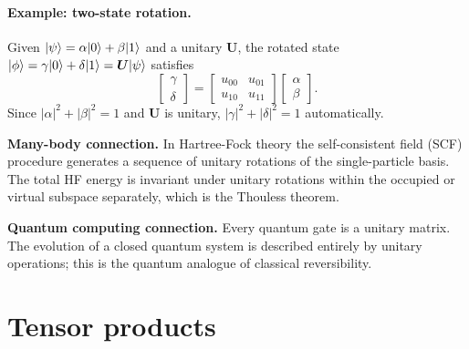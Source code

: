 \paragraph{Example: two-state rotation.}
Given $\vert \psi \rangle=\alpha\vert 0 \rangle+\beta\vert 1 \rangle$ and a unitary $\bm{U}$,
the rotated state
$\vert \phi \rangle=\gamma\vert 0 \rangle+\delta\vert 1 \rangle=\bm{U}\vert \psi \rangle$ satisfies
\[
  \begin{bmatrix}\gamma\\\delta\end{bmatrix}
  =\begin{bmatrix}u_{00}&u_{01}\\u_{10}&u_{11}\end{bmatrix}
  \begin{bmatrix}\alpha\\\beta\end{bmatrix}.
\]
Since $|\alpha|^2+|\beta|^2=1$ and $\bm{U}$ is unitary,
$|\gamma|^2+|\delta|^2=1$ automatically.

\begin{notebox}
\textbf{Many-body connection.} In Hartree-Fock theory the
self-consistent field (SCF) procedure generates a sequence of unitary
rotations of the single-particle basis.  The total HF energy is
invariant under unitary rotations within the occupied or virtual
subspace separately, which is the Thouless theorem.

\textbf{Quantum computing connection.} Every quantum gate is a
unitary matrix.  The evolution of a closed quantum system is described
entirely by unitary operations; this is the quantum analogue of
classical reversibility.
\end{notebox}

\section{Tensor products}
\label{sec:tensor}

